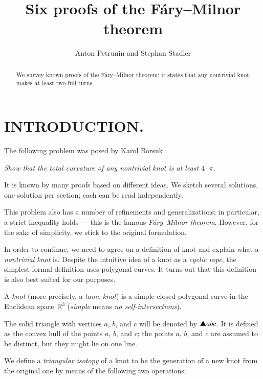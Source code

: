 \documentclass{article}
\newcommand*{\arXiv}[2]{#1} %
\theoremstyle{theorem}
\newtheorem{Crofton-type formula}[theorem]{Crofton-type formula}
\newtheorem{Douglas--Rado theorem}[theorem]{\arXiv{Douglas--Rado theorem}{Theorem}}
\newtheorem{Extended monotonicity theorem}[theorem]{\arXiv{Extended monotonicity theorem}{Theorem}}
\theoremstyle{definition}
\def\solidtriangle{\text{\ding{115}}}
\begin{document}
\title{
\arXiv{Six proofs of the Fáry--Milnor theorem}{Six Proofs of the Fáry--Milnor Theorem}
}
\author{Anton Petrunin and Stephan Stadler}
\date{}
\maketitle

\begin{abstract}
We survey known proofs of the Fáry--Milnor theorem;
it states that any nontrivial knot makes at least two full turns.
\end{abstract}


\section*{INTRODUCTION.}

The following problem was posed by Karol Borsuk \cite{borsuk}.

\smallskip

\textit{Show that the total curvature of any nontrivial knot is at least $4\arXiv{{\cdot}}{}\pi$.}

\smallskip

It is known by many proofs based on different ideas.
We sketch several solutions, one solution per section;
each can be read independently.

This problem also has a number of refinements and generalizations;
in particular, a strict inequality holds --- this is the famous \emph{Fáry--Milnor theorem}.
However, for the sake of simplicity, we stick to the original formulation.

In order to continue, we need to agree on a definition of knot and explain what a \emph{nontrivial knot} is.
Despite the intuitive idea of a knot as a \emph{cyclic rope},
the simplest formal definition uses polygonal curves.
It turns out that this definition is also best suited for our purposes.

A \emph{knot} (more precisely, a \emph{tame knot}) is a simple closed polygonal curve in the Euclidean space~$\mathbb{R}^3$ (\emph{simple} means \emph{no self-intersections}).

The solid triangle with vertices $a$, $b$, and $c$ will be denoted by $\solidtriangle abc$.
It is defined as the convex hull of the points $a$, $b$, and $c$;
the points $a$, $b$, and $c$ are assumed to be distinct, but they might lie on one line.

We define a \emph{triangular isotopy} of a knot to be the generation of a new knot from the original one by means of the
following two operations:
\end{document}

